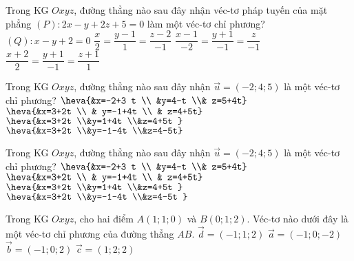 \begin{ex}%
Trong KG $Oxyz$, đường thẳng nào sau đây nhận véc-tơ pháp tuyến của mặt phẳng $(P) \colon 2x-y+2z+5=0$ làm một véc-tơ chỉ phương?
\choice
{$( Q) \colon x-y+2=0$}
{$\dfrac{x}{2}=\dfrac{y-1}{1}=\dfrac{z-2}{-1}$}
{\True $\dfrac{x-1}{-2}=\dfrac{y+1}{-1}=\dfrac{z}{-1}$}
{$\dfrac{x+2}{2}=\dfrac{y+1}{-1}=\dfrac{z+1}{1}$}
\end{ex}
\begin{ex}%
Trong KG $Oxyz$, đường thẳng nào sau đây nhận ${\overrightarrow{u}=(-2 ; 4 ; 5)}$ là một véc-tơ chỉ phương?
\choice
{$\heva{&x=-2+3 t \\ &y=4-t \\& z=5+4t}$}
{$\heva{&x=3+2t \\ & y=-1+4t \\ & z=4+5t}$}
{$\heva{&x=3+2t  \\&y=1+4t  \\&z=4+5t }$}
{\True $\heva{&x=3+2t  \\&y=-1-4t  \\&z=4-5t}$}
\end{ex}
\begin{ex}%
	Trong KG $Oxyz$, đường thẳng nào sau đây nhận $\overrightarrow{u}=(-2;4;5)$ là một véc-tơ chỉ phương?
	\choice
	{$\heva{&x=-2+3 t \\ &y=4-t \\& z=5+4t}$}
	{$\heva{&x=3+2t \\ & y=-1+4t \\ & z=4+5t}$}
	{$\heva{&x=3+2t  \\&y=1+4t  \\&z=4+5t }$}
	{\True $\heva{&x=3+2t  \\&y=-1-4t  \\&z=4-5t }$}
\end{ex}
\begin{ex}%
Trong KG $Oxyz$, cho hai điểm $A(1;1;0)$ và $B( 0;1;2 )$. Véc-tơ nào dưới đây là một véc-tơ chỉ phương của đường thẳng $AB$.
		\choice
		{ $\overrightarrow{d}=(-1;1;2)$}
		{ $\overrightarrow{a}=(-1;0;-2)$}
		{\True $\overrightarrow{b}=(-1;0;2)$}
		{ $\overrightarrow{c}=( 1;2;2)$}
\end{ex}
